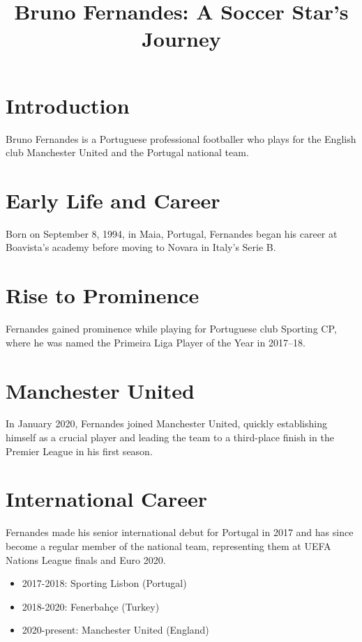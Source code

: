 \documentclass{article}
\title{Bruno Fernandes: A Soccer Star's Journey}
\author{}
\date{}
\begin{document}
   \maketitle

   \section*{Introduction}
   Bruno Fernandes is a Portuguese professional footballer who plays for the English club Manchester United and the Portugal national team.

   \section*{Early Life and Career}
   Born on September 8, 1994, in Maia, Portugal, Fernandes began his career at Boavista's academy before moving to Novara in Italy's Serie B.

   \section*{Rise to Prominence}
   Fernandes gained prominence while playing for Portuguese club Sporting CP, where he was named the Primeira Liga Player of the Year in 2017–18.

   \section*{Manchester United}
   In January 2020, Fernandes joined Manchester United, quickly establishing himself as a crucial player and leading the team to a third-place finish in the Premier League in his first season.

   \section*{International Career}
   Fernandes made his senior international debut for Portugal in 2017 and has since become a regular member of the national team, representing them at UEFA Nations League finals and Euro 2020.

   \begin{itemize}
      \item 2017-2018: Sporting Lisbon (Portugal)
      \item 2018-2020: Fenerbahçe (Turkey)
      \item 2020-present: Manchester United (England)
   \end{itemize}
\end{document}
